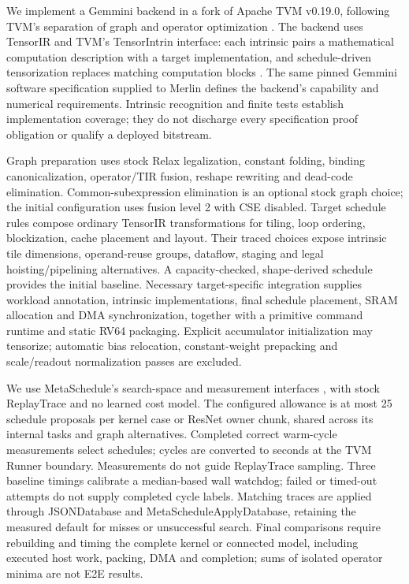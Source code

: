 We implement a Gemmini backend in a fork of Apache TVM v0.19.0, following TVM's
separation of graph and operator optimization \cite{chen2018tvm}.
The backend uses TensorIR and TVM's TensorIntrin interface: each intrinsic pairs
a mathematical computation description with a target implementation, and
schedule-driven tensorization replaces matching computation blocks
\cite{feng2023tensorir}.
The same pinned Gemmini software specification supplied to Merlin defines the
backend's capability and numerical requirements. Intrinsic recognition and
finite tests establish implementation coverage; they do not discharge every
specification proof obligation or qualify a deployed bitstream.

Graph preparation uses stock Relax legalization, constant folding, binding
canonicalization, operator/TIR fusion, reshape rewriting and dead-code
elimination. Common-subexpression elimination is an optional stock graph choice;
the initial configuration uses fusion level 2 with CSE disabled. Target schedule
rules compose ordinary TensorIR transformations for tiling, loop ordering,
blockization, cache placement and layout. Their traced choices expose intrinsic
tile dimensions, operand-reuse groups, dataflow, staging and legal
hoisting/pipelining alternatives. A capacity-checked, shape-derived schedule
provides the initial baseline. Necessary target-specific integration supplies
workload annotation, intrinsic implementations, final schedule placement, SRAM
allocation and DMA synchronization, together with a primitive command runtime
and static RV64 packaging. Explicit accumulator initialization may tensorize;
automatic bias relocation, constant-weight prepacking and scale/readout
normalization passes are excluded.

We use MetaSchedule's search-space and measurement interfaces
\cite{shao2022metaschedule},
with stock ReplayTrace and no learned cost model. The configured allowance is
at most 25 schedule proposals per kernel case or ResNet owner chunk, shared
across its internal tasks and graph alternatives. Completed correct warm-cycle
measurements select schedules; cycles are converted to seconds at the TVM
Runner boundary. Measurements do not guide ReplayTrace sampling. Three baseline
timings calibrate a median-based wall watchdog; failed or timed-out attempts do
not supply completed cycle labels. Matching traces are applied through
JSONDatabase and MetaScheduleApplyDatabase, retaining the measured default for
misses or unsuccessful search. Final comparisons require rebuilding and timing
the complete kernel or connected model, including executed host work, packing,
DMA and completion; sums of isolated operator minima are not E2E results.
